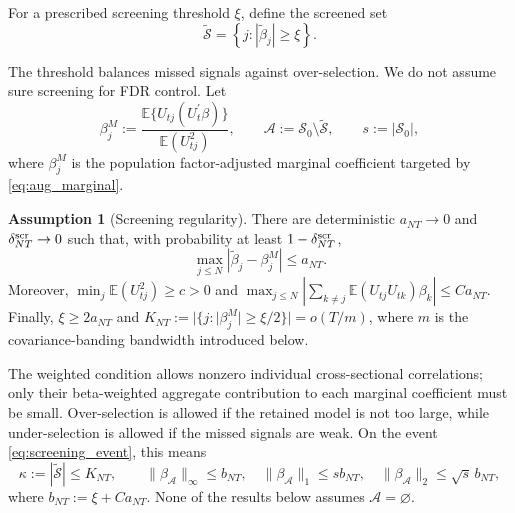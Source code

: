 ﻿\documentclass[12pt]{article}
\newcommand{\0}{\mbox{\bf 0}}
\theoremstyle{plain}%
\theoremstyle{definition}
\newtheorem{assumption}{Assumption}
\begin{document}
For a prescribed screening threshold $\xi$, define the screened set
\begin{equation}
\widetilde{\mathcal{S}} = \left\{ j : \left| \widetilde{\beta}_j \right| \geq \xi \right\}. \label{eq:thres_pre}
\end{equation}
{\color{red}
The threshold balances missed signals against over-selection.  We do not
assume sure screening for FDR control.  Let
\[
\beta_j^M:=
\frac{\mathbb E\{U_{tj}(U_t^\prime\beta)\}}{\mathbb E(U_{tj}^2)},\qquad
\mathcal A:=\mathcal S_0\setminus\widetilde{\mathcal S},\qquad
s:=|\mathcal S_0|,
\]
where $\beta_j^M$ is the population factor-adjusted marginal coefficient
targeted by \eqref{eq:aug_marginal}.

\begin{assumption}[Screening regularity]
\label{ass:screening}
There are deterministic $a_{NT}\to0$ and $\delta_{NT}^{\rm scr}\to0$ such
that, with probability at least $1-\delta_{NT}^{\rm scr}$,
\begin{equation}
\max_{j\le N}|\widetilde\beta_j-\beta_j^M|\le a_{NT}.
\label{eq:screening_event}
\end{equation}
Moreover, $\min_j\mathbb E(U_{tj}^2)\ge c>0$ and
$\max_{j\le N}|\sum_{k\ne j}\mathbb E(U_{tj}U_{tk})\beta_k|
\le Ca_{NT}$.
Finally, $\xi\ge2a_{NT}$ and
$K_{NT}:=|\{j:|\beta_j^M|\ge\xi/2\}|=o(T/m)$,
where $m$ is the covariance-banding bandwidth introduced below.
\end{assumption}

The weighted condition allows nonzero individual cross-sectional correlations;
only their beta-weighted aggregate contribution to each marginal coefficient
must be small. Over-selection is allowed if the retained model is not too large,
while under-selection is allowed if the missed signals are weak.  On the
event \eqref{eq:screening_event}, this means
\[
\kappa:=|\widetilde{\mathcal S}|\le K_{NT},\qquad
\|\beta_{\mathcal A}\|_\infty\le b_{NT},\quad
\|\beta_{\mathcal A}\|_1\le s b_{NT},\quad
\|\beta_{\mathcal A}\|_2\le\sqrt{s}\,b_{NT},
\]
where $b_{NT}:=\xi+C a_{NT}$. None of the results below assumes
$\mathcal A=\varnothing$.

}
\end{document}
